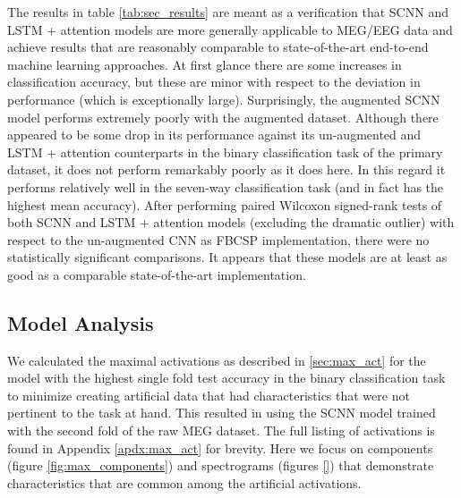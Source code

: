 \documentclass[fleqn,10pt]{wlscirep}
\begin{document}
The results in table \ref{tab:sec_results} are meant as a verification that SCNN and LSTM + attention models are more generally applicable to MEG/EEG data and achieve results that are reasonably comparable to state-of-the-art end-to-end machine learning approaches. At first glance there are some increases in classification accuracy, but these are minor with respect to the deviation in performance (which is exceptionally large). Surprisingly, the augmented SCNN model performs extremely poorly with the augmented dataset. Although there appeared to be some drop in its performance against its un-augmented and LSTM + attention counterparts in the binary classification task of the primary dataset, it does not perform remarkably poorly as it does here. In this regard it performs relatively well in the seven-way classification task (and in fact has the highest mean accuracy). After performing paired Wilcoxon signed-rank tests of both SCNN and LSTM + attention models (excluding the dramatic outlier) with respect to the un-augmented CNN as FBCSP implementation, there were no statistically significant comparisons. It appears that these models are at least as good as a comparable state-of-the-art implementation.

\subsection*{Model Analysis}

We calculated the maximal activations as described in \ref{sec:max_act} for the model with the highest single fold test accuracy in the binary classification task to minimize creating artificial data that had characteristics that were not pertinent to the task at hand. This resulted in using the SCNN model trained with the second fold of the raw MEG dataset. The full listing of activations is found in Appendix \ref{apdx:max_act} for brevity. Here we focus on components (figure \ref{fig:max_components}) and spectrograms (figures \ref{}) that demonstrate characteristics that are common among the artificial activations.
\end{document}
